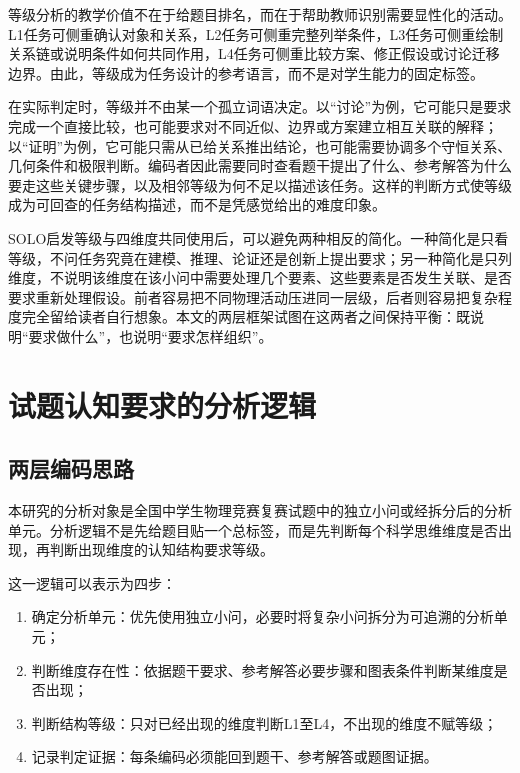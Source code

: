\documentclass[
  12pt,
  a4paper,twoside,openany]{ctexbook}
\providecommand{\tightlist}{%
  \setlength{\itemsep}{0pt}\setlength{\parskip}{0pt}}
\begin{document}
等级分析的教学价值不在于给题目排名，而在于帮助教师识别需要显性化的活动。L1任务可侧重确认对象和关系，L2任务可侧重完整列举条件，L3任务可侧重绘制关系链或说明条件如何共同作用，L4任务可侧重比较方案、修正假设或讨论迁移边界。由此，等级成为任务设计的参考语言，而不是对学生能力的固定标签。

在实际判定时，等级并不由某一个孤立词语决定。以``讨论''为例，它可能只是要求完成一个直接比较，也可能要求对不同近似、边界或方案建立相互关联的解释；以``证明''为例，它可能只需从已给关系推出结论，也可能需要协调多个守恒关系、几何条件和极限判断。编码者因此需要同时查看题干提出了什么、参考解答为什么要走这些关键步骤，以及相邻等级为何不足以描述该任务。这样的判断方式使等级成为可回查的任务结构描述，而不是凭感觉给出的难度印象。

SOLO启发等级与四维度共同使用后，可以避免两种相反的简化。一种简化是只看等级，不问任务究竟在建模、推理、论证还是创新上提出要求；另一种简化是只列维度，不说明该维度在该小问中需要处理几个要素、这些要素是否发生关联、是否要求重新处理假设。前者容易把不同物理活动压进同一层级，后者则容易把复杂程度完全留给读者自行想象。本文的两层框架试图在这两者之间保持平衡：既说明``要求做什么''，也说明``要求怎样组织''。

\section{试题认知要求的分析逻辑}\label{ux8bd5ux9898ux8ba4ux77e5ux8981ux6c42ux7684ux5206ux6790ux903bux8f91}

\subsection{两层编码思路}\label{ux4e24ux5c42ux7f16ux7801ux601dux8def}

本研究的分析对象是全国中学生物理竞赛复赛试题中的独立小问或经拆分后的分析单元。分析逻辑不是先给题目贴一个总标签，而是先判断每个科学思维维度是否出现，再判断出现维度的认知结构要求等级。

这一逻辑可以表示为四步：

\begin{enumerate}
\def\labelenumi{\arabic{enumi}.}
\tightlist
\item
  确定分析单元：优先使用独立小问，必要时将复杂小问拆分为可追溯的分析单元；
\item
  判断维度存在性：依据题干要求、参考解答必要步骤和图表条件判断某维度是否出现；
\item
  判断结构等级：只对已经出现的维度判断L1至L4，不出现的维度不赋等级；
\item
  记录判定证据：每条编码必须能回到题干、参考解答或题图证据。
\end{enumerate}
\end{document}

